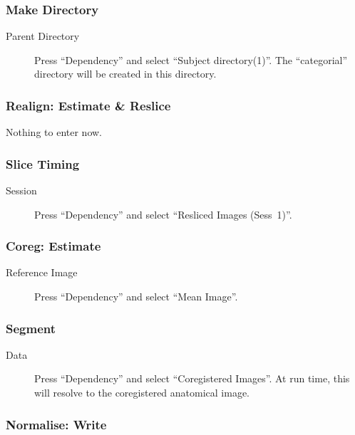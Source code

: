 \subsubsection*{Make Directory}

\begin{description}
\item[Parent Directory] Press ``Dependency'' and select ``Subject
  directory(1)''. The ``categorial'' directory will be created in this
  directory. 
\end{description}

\subsubsection*{Realign: Estimate \& Reslice}

Nothing to enter now.

\subsubsection*{Slice Timing}

\begin{description}
\item[Session] Press ``Dependency'' and select ``Resliced Images (Sess~1)''.
\end{description}

\subsubsection*{Coreg: Estimate}

\begin{description}
\item[Reference Image] Press ``Dependency'' and select ``Mean Image''.
\end{description}

\subsubsection*{Segment}

\begin{description}
\item[Data] Press ``Dependency'' and select ``Coregistered Images''. At run
  time, this will resolve to the coregistered anatomical image.
\end{description}

\subsubsection*{Normalise: Write}

